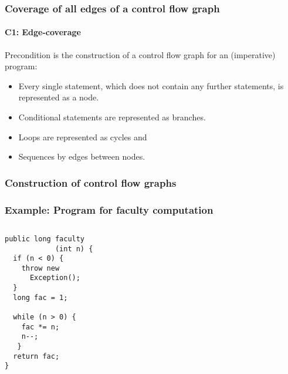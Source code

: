 \begin{frame}
\frametitle{Coverage of all edges of a control flow graph}
\framesubtitle{C1: Edge-coverage}
Precondition is the construction of a control flow graph for an (imperative) program:
\begin{itemize}
  \item Every single statement, which does not contain any further statements, is represented as a node.
  \item Conditional statements are represented as branches.
  \item Loops are represented as cycles and 
  \item Sequences by edges between nodes.
\end{itemize}
\end{frame}


\begin{frame}
\frametitle{Construction of control flow graphs}
\begin{center}
\end{center}
\end{frame}


\begin{frame}[fragile]
\frametitle{Example: Program for faculty computation}
\begin{columns}
\begin{column}{0.4\textwidth}
\lstset{language=Java,basicstyle=\small}
\begin{lstlisting}
public long faculty
            (int n) {
  if (n < 0) {
    throw new 
      Exception();
  }
  long fac = 1;

  while (n > 0) {
    fac *= n;
    n--;
   }
  return fac;
}
\end{lstlisting}
\end{column}
\pause
\begin{column}{0.6\textwidth}
\begin{center}
\end{center}
\end{column}
\end{columns}
\end{frame}


